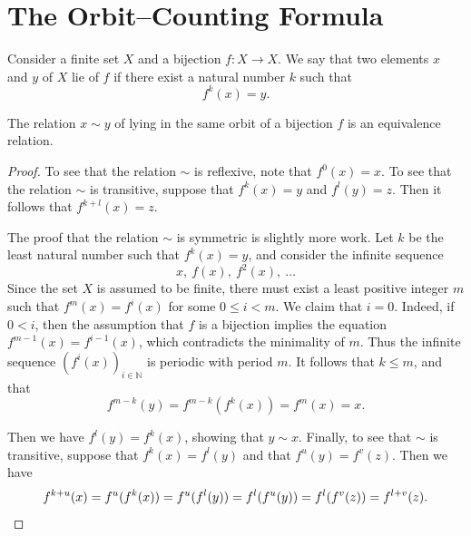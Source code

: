 \section{The Orbit--Counting Formula}

\begin{definition}
  Consider a finite set $X$ and a bijection $f:X\to X$. We say that two elements $x$ and $y$ of $X$ lie  of $f$ if there exist a natural number $k$ such that
  \begin{equation*}
    f^k(x)=y.
  \end{equation*}
\end{definition}

\begin{proposition}
  The relation $x\sim y$ of lying in the same orbit of a bijection $f$ is an equivalence relation.
\end{proposition}

\begin{proof}
  To see that the relation $\sim$ is reflexive, note that $f^0(x)=x$. To see that the relation $\sim$ is transitive, suppose that $f^k(x)=y$ and $f^l(y)=z$. Then it follows that $f^{k+l}(x)=z$.

  The proof that the relation $\sim$ is symmetric is slightly more work. Let $k$ be the least natural number such that $f^k(x)=y$, and consider the infinite sequence
  \begin{equation*}
    x,~f(x),~f^2(x),~\ldots
  \end{equation*}
  Since the set $X$ is assumed to be finite, there must exist a least positive integer $m$ such that $f^m(x)=f^i(x)$ for some $0\leq i<m$. We claim that $i=0$. Indeed, if $0<i$, then the assumption that $f$ is a bijection implies the equation $f^{m-1}(x)=f^{i-1}(x)$, which contradicts the minimality of $m$. Thus the infinite sequence $(f^i(x))_{i\in\mathbb{N}}$ is periodic with period $m$. It follows that $k\leq m$, and that
  \begin{equation*}
    f^{m-k}(y)=f^{m-k}(f^k(x))=f^m(x)=x.
  \end{equation*}

  Then we have $f^l(y)=f^k(x)$, showing that $y\sim x$. Finally, to see that $\sim$ is transitive, suppose that $f^k(x)=f^l(y)$ and that $f^u(y)=f^v(z)$. Then we have
  \begin{equation*}
    f^{k+u}(x)=f^u(f^k(x))=f^u(f^l(y))=f^l(f^u(y))=f^l(f^v(z))=f^{l+v}(z).\qedhere
  \end{equation*}
\end{proof}

